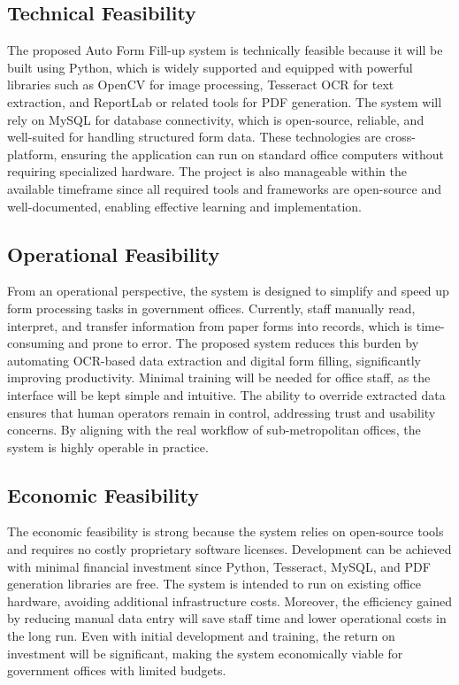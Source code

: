 \documentclass[12pt,a4paper]{report}
\begin{document}
\subsection{Technical Feasibility}
The proposed Auto Form Fill-up system is technically feasible because it will be built using Python, which is widely supported and equipped with powerful libraries such as OpenCV for image processing, Tesseract OCR for text extraction, and ReportLab or related tools for PDF generation. The system will rely on MySQL for database connectivity, which is open-source, reliable, and well-suited for handling structured form data. These technologies are cross-platform, ensuring the application can run on standard office computers without requiring specialized hardware. The project is also manageable within the available timeframe since all required tools and frameworks are open-source and well-documented, enabling effective learning and implementation.
\subsection{Operational Feasibility}
From an operational perspective, the system is designed to simplify and speed up form processing tasks in government offices. Currently, staff manually read, interpret, and transfer information from paper forms into records, which is time-consuming and prone to error. The proposed system reduces this burden by automating OCR-based data extraction and digital form filling, significantly improving productivity. Minimal training will be needed for office staff, as the interface will be kept simple and intuitive. The ability to override extracted data ensures that human operators remain in control, addressing trust and usability concerns. By aligning with the real workflow of sub-metropolitan offices, the system is highly operable in practice.
\subsection{Economic Feasibility}
The economic feasibility is strong because the system relies on open-source tools and requires no costly proprietary software licenses. Development can be achieved with minimal financial investment since Python, Tesseract, MySQL, and PDF generation libraries are free. The system is intended to run on existing office hardware, avoiding additional infrastructure costs. Moreover, the efficiency gained by reducing manual data entry will save staff time and lower operational costs in the long run. Even with initial development and training, the return on investment will be significant, making the system economically viable for government offices with limited budgets.
\end{document}
